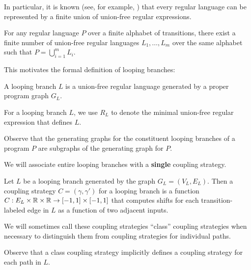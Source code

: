 In particular, it is known (see, for example, \cite{afoninMinimalUnionFreeDecompositions2009}) that every regular language can be represented by a finite union of union-free regular expressions. 

\begin{cor}
    For any regular language $P$ over a finite alphabet of transitions, there exist a finite number of union-free regular languages $L_1,\ldots, L_m$ over the same alphabet such that $P = \bigcup_{i=1}^m L_i$.
\end{cor}

This motivates the formal definition of looping branches:

\begin{defn}
    A looping branch $L$ is a union-free regular language generated by a proper program graph $G_L$.
\end{defn}

For a looping branch $L$, we use $R_L$ to denote the minimal union-free regular expression that defines $L$. 

Observe that the generating graphs for the constituent looping branches of a program $P$ are subgraphs of the generating graph for $P$. 

We will associate entire looping branches with a \textbf{single} coupling strategy.

\begin{defn}
    Let $L$ be a looping branch generated by the graph $G_L = (V_L, E_L)$. Then a coupling strategy $C = (\gamma, \gamma')$ for a looping branch is a function $C:E_L\times\mathbb{R} \times\mathbb{R}\to [-1, 1]\times[-1, 1]$ that computes shifts for each transition-labeled edge in $L$ as a function of two adjacent inputs.
\end{defn}

We will sometimes call these coupling strategies ``class'' coupling strategies when necessary to distinguish them from coupling strategies for individual paths.

Observe that a class coupling strategy implicitly defines a coupling strategy for each path in $L$.

